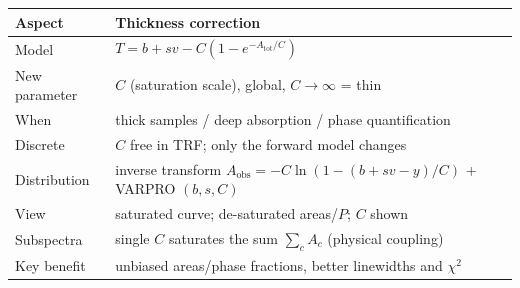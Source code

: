 \documentclass[11pt,a4paper]{article}
\begin{document}
\begin{center}
\begin{tabular}{@{}ll@{}}
\toprule
\textbf{Aspect} & \textbf{Thickness correction}\\
\midrule
Model & $T=b+s v - C(1-e^{-A_{\text{tot}}/C})$ \\
New parameter & $C$ (saturation scale), global, $C\to\infty$ = thin\\
When & thick samples / deep absorption / phase quantification\\
Discrete & $C$ free in TRF; only the forward model changes\\
Distribution & inverse transform $A_{\text{obs}}=-C\ln(1-(b+sv-y)/C)$ + VARPRO $(b,s,C)$\\
View & saturated curve; de-saturated areas/$P$; $C$ shown\\
Subspectra & single $C$ saturates the sum $\sum_c A_c$ (physical coupling)\\
Key benefit & unbiased areas/phase fractions, better linewidths and $\chi^2$\\
\bottomrule
\end{tabular}
\end{center}
\end{document}
